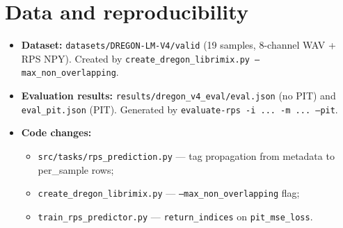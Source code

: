 \documentclass[11pt,a4paper]{article}
\begin{document}
\section{Data and reproducibility}

\begin{itemize}
  \item \textbf{Dataset:} \texttt{datasets/DREGON-LM-V4/valid} (19 samples, 8-channel WAV + RPS NPY).
    Created by \texttt{create\_dregon\_librimix.py --max\_non\_overlapping}.
  \item \textbf{Evaluation results:} \texttt{results/dregon\_v4\_eval/eval.json} (no PIT) and
    \texttt{eval\_pit.json} (PIT). Generated by \texttt{evaluate-rps -i ... -m ... --pit}.
  \item \textbf{Code changes:}
    \begin{itemize}
      \item \texttt{src/tasks/rps\_prediction.py} --- tag propagation from metadata to per\_sample rows;
      \item \texttt{create\_dregon\_librimix.py} --- \texttt{--max\_non\_overlapping} flag;
      \item \texttt{train\_rps\_predictor.py} --- \texttt{return\_indices} on \texttt{pit\_mse\_loss}.
    \end{itemize}
\end{itemize}
\end{document}
